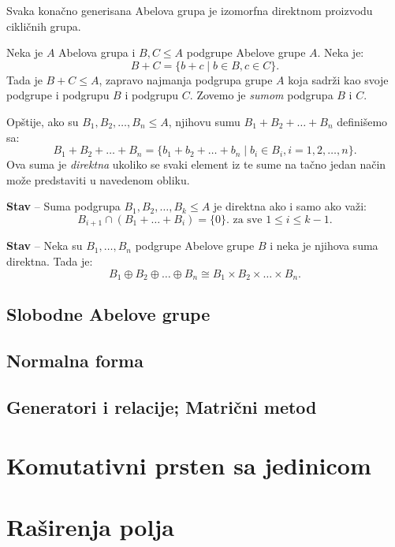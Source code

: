 \documentclass[a4paper,12pt]{article}
\newcommand{\f}[1]{\(#1\)}
\begin{document}
\medskip
Svaka konačno generisana Abelova grupa je izomorfna direktnom proizvodu cikličnih grupa.

Neka je \f{A} Abelova grupa i \f{B, C \leq A} podgrupe Abelove grupe \f{A}. Neka je:
\[
  B + C = \{ b + c \mid b \in B, c \in C \}.
\]
Tada je \f{B + C \leq A}, zapravo najmanja podgrupa grupe \f{A} koja sadrži kao svoje podgrupe i 
podgrupu \f{B} i podgrupu \f{C}. Zovemo je \emph{sumom} podgrupa \f{B} i \f{C}.

Opštije, ako su \f{B_1, B_2, \dots, B_n \leq A}, njihovu sumu \f{B_1 + B_2 + \dots + B_n} definišemo sa:
\[
  B_1 + B_2 + \dots + B_n = \{ b_1 + b_2 + \dots + b_n \mid b_i \in B_i, i = 1, 2, \dots, n \}.
\]
Ova suma je \emph{direktna} ukoliko se svaki element iz te sume na tačno jedan način može predstaviti u navedenom obliku.

\smallskip
\textbf{Stav} -- Suma podgrupa \f{B_1, B_2, \dots, B_k \leq A} je direktna ako i samo ako važi:
\[
  B_{i+1} \cap (B_1 +  \dots + B_i) = \{0\}. \text{ za sve } 1 \leq i \leq k - 1.
\]

\textbf{Stav} -- Neka su \f{B_1, \dots, B_n} podgrupe Abelove grupe \f{B} i neka je njihova suma direktna.
Tada je:
\[
  B_1 \oplus B_2 \oplus \dots \oplus B_n \cong B_1 \times B_2 \times \dots \times B_n.
\]

\subsection{Slobodne Abelove grupe}




\subsection{Normalna forma}

\subsection{Generatori i relacije; Matrični metod}

\section{Komutativni prsten sa jedinicom}

\section{Raširenja polja}
\end{document}

